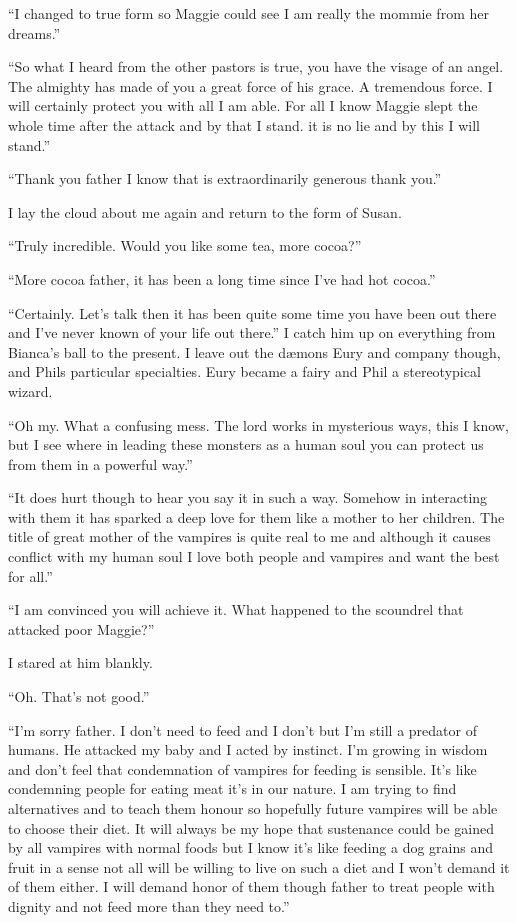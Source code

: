 ``I changed to true form so Maggie could see I am really the mommie from her dreams.''

``So what I heard from the other pastors is true, you have the visage of an angel. The almighty has made of you a great force of his grace. A tremendous force. I will certainly protect you with all I am able. For all I know Maggie slept the whole time after the attack and by that I stand. it is no lie and by this I will stand.''

``Thank you father I know that is extraordinarily generous thank you.''

I lay the cloud about me again and return to the form of Susan.

``Truly incredible. Would you like some tea, more cocoa?''

``More cocoa father, it has been a long time since I've had hot cocoa.''

``Certainly. Let's talk then it has been quite some time you have been out there and I've never known of your life out there.''
I catch him up on everything from Bianca's ball to the present. I leave out the d\ae mons Eury and company though, and Phils particular specialties. Eury became a fairy and Phil a stereotypical wizard.

``Oh my. What a confusing mess. The lord works in mysterious ways, this I know, but I see where in leading these monsters as a human soul you can protect us from them in a powerful way.''

``It does hurt though to hear you say it in such a way. Somehow in interacting with them it has sparked a deep love for them like a mother to her children. The title of great mother of the vampires is quite real to me and although it causes conflict with my human soul I love both people and vampires and want the best for all.''

``I am convinced you will achieve it. What happened to the scoundrel that attacked poor Maggie?''

I stared at him blankly.

``Oh. That's not good.''

``I'm sorry father. I don't need to feed and I don't but I'm still a predator of humans. He attacked my baby and I acted by instinct. I'm growing in wisdom and don't feel that condemnation of vampires for feeding is sensible. It's like condemning people for eating meat it's in our nature. I am trying to find alternatives and to teach them honour so hopefully future vampires will be able to choose their diet. It will always be my hope that sustenance could be gained by all vampires with normal foods but I know it's like feeding a dog grains and fruit in a sense not all will be willing to live on such a diet and I won't demand it of them either. I will demand honor of them though father to treat people with dignity and not feed more than they need to.''

